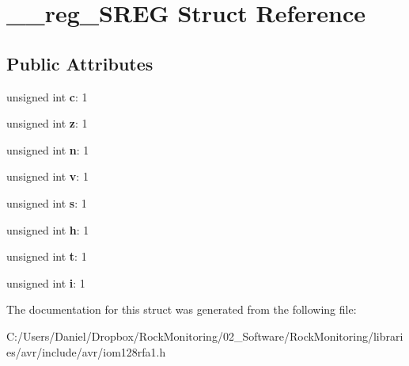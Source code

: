 \hypertarget{struct____reg___s_r_e_g}{}\section{\+\_\+\+\_\+reg\+\_\+\+S\+R\+EG Struct Reference}
\label{struct____reg___s_r_e_g}
\subsection*{Public Attributes}
\begin{DoxyCompactItemize}
\item 
unsigned int {\bfseries c}\+: 1\hypertarget{struct____reg___s_r_e_g_aba08f0d8eb9c948bca143391aa8799b6}{}\label{struct____reg___s_r_e_g_aba08f0d8eb9c948bca143391aa8799b6}

\item 
unsigned int {\bfseries z}\+: 1\hypertarget{struct____reg___s_r_e_g_a19e1bd5dec772e1133532b19715c66b3}{}\label{struct____reg___s_r_e_g_a19e1bd5dec772e1133532b19715c66b3}

\item 
unsigned int {\bfseries n}\+: 1\hypertarget{struct____reg___s_r_e_g_a4ddbc3405ecb7f4ddd53bb091ec84421}{}\label{struct____reg___s_r_e_g_a4ddbc3405ecb7f4ddd53bb091ec84421}

\item 
unsigned int {\bfseries v}\+: 1\hypertarget{struct____reg___s_r_e_g_a5e383cabbfefd9d0d1879262ec5de399}{}\label{struct____reg___s_r_e_g_a5e383cabbfefd9d0d1879262ec5de399}

\item 
unsigned int {\bfseries s}\+: 1\hypertarget{struct____reg___s_r_e_g_a808eefa9beb97ecfa02b3d940662964b}{}\label{struct____reg___s_r_e_g_a808eefa9beb97ecfa02b3d940662964b}

\item 
unsigned int {\bfseries h}\+: 1\hypertarget{struct____reg___s_r_e_g_aa0c5ea107c7840c84209322c83752b9d}{}\label{struct____reg___s_r_e_g_aa0c5ea107c7840c84209322c83752b9d}

\item 
unsigned int {\bfseries t}\+: 1\hypertarget{struct____reg___s_r_e_g_a1ceedb5d5b0ccbe47ccab57d0d2e336c}{}\label{struct____reg___s_r_e_g_a1ceedb5d5b0ccbe47ccab57d0d2e336c}

\item 
unsigned int {\bfseries i}\+: 1\hypertarget{struct____reg___s_r_e_g_a255f69b6440e5749c0922334c69e04c5}{}\label{struct____reg___s_r_e_g_a255f69b6440e5749c0922334c69e04c5}

\end{DoxyCompactItemize}


The documentation for this struct was generated from the following file\+:\begin{DoxyCompactItemize}
\item 
C\+:/\+Users/\+Daniel/\+Dropbox/\+Rock\+Monitoring/02\+\_\+\+Software/\+Rock\+Monitoring/libraries/avr/include/avr/iom128rfa1.\+h\end{DoxyCompactItemize}
